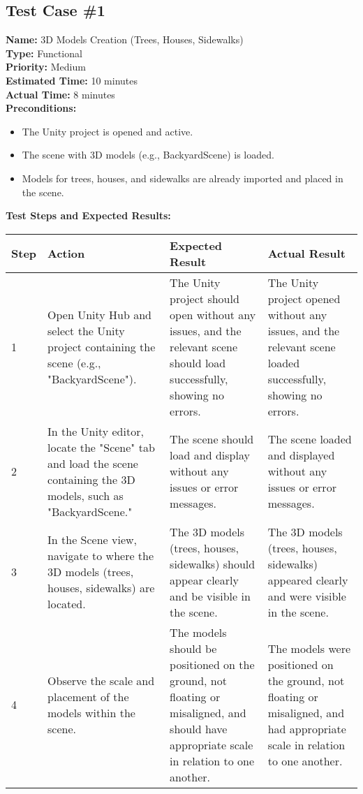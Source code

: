 \documentclass[11pt]{article}
\begin{document}
\subsection{Test Case \#1}
\textbf{Name:} 3D Models Creation (Trees, Houses, Sidewalks)\\
\textbf{Type:} Functional \\
\textbf{Priority:} Medium \\
\textbf{Estimated Time:} 10 minutes \\
\textbf{Actual Time:} 8 minutes \\
\textbf{Preconditions:} 
\begin{itemize}
\item The Unity project is opened and active. 
\item The scene with 3D models (e.g., BackyardScene) is loaded.
\item Models for trees, houses, and sidewalks are already imported and placed in the scene. 
\end{itemize}
\textbf{Test Steps and Expected Results:} \\
\begin{tabular}{@{} p{0.8cm} p{4.6cm} p{4.6cm} p{4.6cm} @{}}
\toprule
\textbf{Step} & \textbf{Action} & \textbf{Expected Result} & \textbf{Actual Result} \\
\midrule
1 & Open Unity Hub and select the Unity project containing the scene (e.g., "BackyardScene"). & The Unity project should open without any issues, and the relevant scene should load successfully, showing no errors. & The Unity project opened without any issues, and the relevant scene loaded successfully, showing no errors. \\
2 & In the Unity editor, locate the "Scene" tab and load the scene containing the 3D models, such as "BackyardScene." & The scene should load and display without any issues or error messages. & The scene loaded and displayed without any issues or error messages. \\
3 & In the Scene view, navigate to where the 3D models (trees, houses, sidewalks) are located. & The 3D models (trees, houses, sidewalks) should appear clearly and be visible in the scene. & The 3D models (trees, houses, sidewalks) appeared clearly and were visible in the scene. \\
4 & Observe the scale and placement of the models within the scene. & The models should be positioned on the ground, not floating or misaligned, and should have appropriate scale in relation to one another. & The models were positioned on the ground, not floating or misaligned, and had appropriate scale in relation to one another. \\
\bottomrule
\end{tabular}
\end{document}
